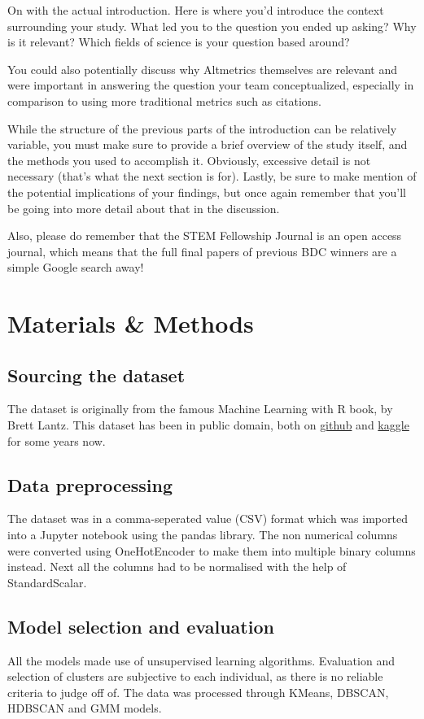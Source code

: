\documentclass[12pt,twocolumn,letterpaper]{article}
\begin{document}
On with the actual introduction. Here is where you'd introduce the context surrounding your study. What led you to the question you ended up asking? Why is it relevant? Which fields of science is your question based around?

You could also potentially discuss why Altmetrics themselves are relevant and were important in answering the question your team conceptualized, especially in comparison to using more traditional metrics such as citations.

While the structure of the previous parts of the introduction can be relatively variable, you must make sure to provide a brief overview of the study itself, and the methods you used to accomplish it. Obviously, excessive detail is not necessary (that's what the next section is for). Lastly, be sure to make mention of the potential implications of your findings, but once again remember that you'll be going into more detail about that in the discussion.

Also, please do remember that the STEM Fellowship Journal is an open access journal, which means that the full final papers of previous BDC winners are a simple Google search away!

\section{Materials \& Methods}

\subsection{Sourcing the dataset}
The dataset is originally from the famous Machine Learning with R book, by Brett Lantz. This dataset has been in public domain, both on \href{https://github.com/stedy/Machine-Learning-with-R-datasets}{github} and \href{https://www.kaggle.com/datasets/mirichoi0218/insurance}{kaggle} for some years now.
\subsection{Data preprocessing}
The dataset was in a comma-seperated value (CSV) format which was imported into a Jupyter notebook using the pandas library. The non numerical columns were converted using OneHotEncoder to make them into multiple binary columns instead. Next all the columns had to be normalised with the help of StandardScalar.
\subsection{Model selection and evaluation}
All the models made use of unsupervised learning algorithms. Evaluation and selection of clusters are subjective to each individual, as there is no reliable criteria to judge off of. The data was processed through KMeans, DBSCAN, HDBSCAN and GMM models.
\end{document}
